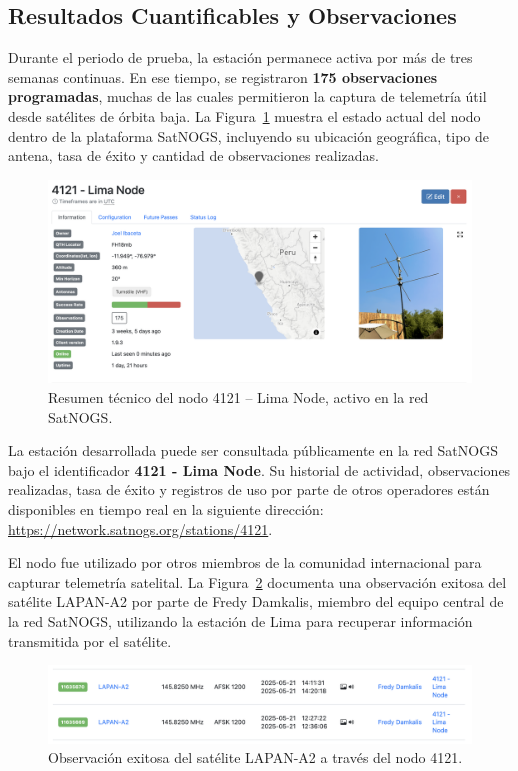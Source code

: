 \documentclass[conference]{IEEEtran}
\begin{document}
\subsection{Resultados Cuantificables y Observaciones}

Durante el periodo de prueba, la estación permanece activa por más de tres semanas continuas. En ese tiempo, se registraron \textbf{175 observaciones programadas}, muchas de las cuales permitieron la captura de telemetría útil desde satélites de órbita baja. La Figura~\ref{fig:resumen_satnogs} muestra el estado actual del nodo dentro de la plataforma SatNOGS, incluyendo su ubicación geográfica, tipo de antena, tasa de éxito y cantidad de observaciones realizadas.


\begin{figure}[H]
  \centering
  \includegraphics[width=0.95\linewidth]{figs/4121_Node.png}
  \caption{Resumen técnico del nodo 4121 – Lima Node, activo en la red SatNOGS.}
  \label{fig:resumen_satnogs}
\end{figure}

La estación desarrollada puede ser consultada públicamente en la red SatNOGS bajo el identificador \textbf{4121 - Lima Node}. Su historial de actividad, observaciones realizadas, tasa de éxito y registros de uso por parte de otros operadores están disponibles en tiempo real en la siguiente dirección: \url{https://network.satnogs.org/stations/4121}.

El nodo fue utilizado por otros miembros de la comunidad internacional para capturar telemetría satelital. La Figura~\ref{fig:telemetria_lapan} documenta una observación exitosa del satélite LAPAN-A2 por parte de Fredy Damkalis, miembro del equipo central de la red SatNOGS, utilizando la estación de Lima para recuperar información transmitida por el satélite.

\begin{figure}[H]
  \centering
  \includegraphics[width=1\linewidth]{figs/observacion_fredy.png}
  \caption{Observación exitosa del satélite LAPAN-A2 a través del nodo 4121.}
  \label{fig:telemetria_lapan}
\end{figure}
\end{document}
